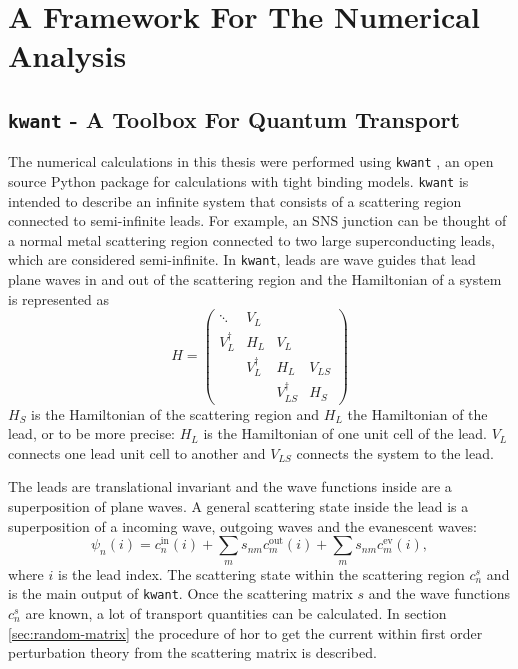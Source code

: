 \chapter{A Framework For The Numerical Analysis}
\label{ch:basics-numerical}
\section{\texttt{kwant} - A Toolbox For Quantum Transport}
The numerical calculations in this thesis were performed using \texttt{kwant} \cite{Groth2014}, an open source Python package for calculations with tight binding models. \texttt{kwant} is intended to describe an infinite system that consists of a scattering region connected to semi-infinite leads. For example, an SNS junction can be thought of a normal metal scattering region connected to two large superconducting leads, which are considered semi-infinite. In \texttt{kwant}, leads are wave guides that lead plane waves in and out of the scattering region and the Hamiltonian of  a system is represented as
\begin{equation}
H = \begin{pmatrix}
\ddots & V_L & &  \\
V_L^\dagger & H_L & V_L &   \\
 & V_L^\dagger & H_L & V_{LS} \\
 & & V_{LS}^\dagger & H_S 
\end{pmatrix}
\end{equation}
$H_S$ is the Hamiltonian of the scattering region and $H_L$ the Hamiltonian of the lead, or to be more precise: $H_L$ is the Hamiltonian of one unit cell of the lead. $V_L$ connects one lead unit cell to another and $V_{LS}$ connects the system to the lead.

The leads are translational invariant and the wave functions inside are a superposition of plane waves. A general scattering state inside the lead is a superposition of a incoming wave, outgoing waves and the evanescent waves:
\begin{equation}
\psi_n ( i ) = c_n^\text{in} ( i ) + \sum_m s_{nm} c_m^\text{out} ( i ) + \sum_m s_{nm} c_m^\text{ev} ( i ),
\end{equation}
where $i$ is the lead index. The scattering state within the scattering region $c_n^s$ and is the main output of \texttt{kwant}. Once the scattering matrix $s$ and the wave functions $c_n^s$ are known, a lot of transport quantities can be calculated. In section \ref{sec:random-matrix} the procedure of hor to get the current within first order perturbation theory from the scattering matrix is described.

